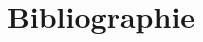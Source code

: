 \documentclass[12pt,oneside,french]{book}
\begin{document}
\title{Bibliographie}

\maketitle
\nocite{*}
\printbibliography
\end{document}
